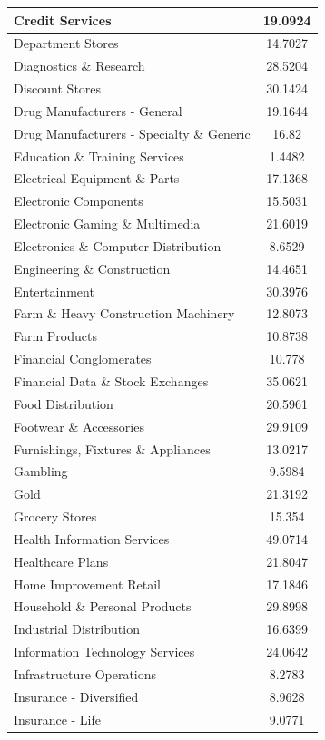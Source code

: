 \documentclass{article}
\begin{document}
\begin{xtabular}{|l|c|}
Credit Services & 19.0924\\ \hline
Department Stores & 14.7027\\ \hline
Diagnostics \& Research & 28.5204\\ \hline
Discount Stores & 30.1424\\ \hline
Drug Manufacturers - General & 19.1644\\ \hline
Drug Manufacturers - Specialty \& Generic & 16.82\\ \hline
Education \& Training Services & 1.4482\\ \hline
Electrical Equipment \& Parts & 17.1368\\ \hline
Electronic Components & 15.5031\\ \hline
Electronic Gaming \& Multimedia & 21.6019\\ \hline
Electronics \& Computer Distribution & 8.6529\\ \hline
Engineering \& Construction & 14.4651\\ \hline
Entertainment & 30.3976\\ \hline
Farm \& Heavy Construction Machinery & 12.8073\\ \hline
Farm Products & 10.8738\\ \hline
Financial Conglomerates & 10.778\\ \hline
Financial Data \& Stock Exchanges & 35.0621\\ \hline
Food Distribution & 20.5961\\ \hline
Footwear \& Accessories & 29.9109\\ \hline
Furnishings, Fixtures \& Appliances & 13.0217\\ \hline
Gambling & 9.5984\\ \hline
Gold & 21.3192\\ \hline
Grocery Stores & 15.354\\ \hline
Health Information Services & 49.0714\\ \hline
Healthcare Plans & 21.8047\\ \hline
Home Improvement Retail & 17.1846\\ \hline
Household \& Personal Products & 29.8998\\ \hline
Industrial Distribution & 16.6399\\ \hline
Information Technology Services & 24.0642\\ \hline
Infrastructure Operations & 8.2783\\ \hline
Insurance - Diversified & 8.9628\\ \hline
Insurance - Life & 9.0771\\ \hline

\end{xtabular}
\end{document}
